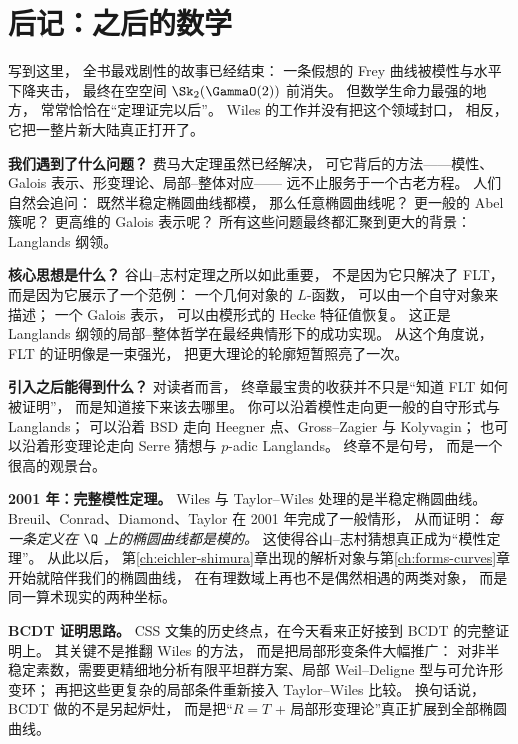 \section{后记：之后的数学}
\label{sec:ch10-epilogue}

写到这里，
全书最戏剧性的故事已经结束：
一条假想的 Frey 曲线被模性与水平下降夹击，
最终在空空间 $\Sk_2(\GammaO(2))$ 前消失。
但数学生命力最强的地方，
常常恰恰在“定理证完以后”。
Wiles 的工作并没有把这个领域封口，
相反，它把一整片新大陆真正打开了。

\textbf{我们遇到了什么问题？}
费马大定理虽然已经解决，
可它背后的方法——模性、Galois 表示、形变理论、局部--整体对应——
远不止服务于一个古老方程。
人们自然会追问：
既然半稳定椭圆曲线都模，
那么任意椭圆曲线呢？
更一般的 Abel 簇呢？
更高维的 Galois 表示呢？
所有这些问题最终都汇聚到更大的背景：Langlands 纲领。

\textbf{核心思想是什么？}
谷山--志村定理之所以如此重要，
不是因为它只解决了 FLT，
而是因为它展示了一个范例：
一个几何对象的 $L$-函数，
可以由一个自守对象来描述；
一个 Galois 表示，
可以由模形式的 Hecke 特征值恢复。
这正是 Langlands 纲领的局部--整体哲学在最经典情形下的成功实现。
从这个角度说，
FLT 的证明像是一束强光，
把更大理论的轮廓短暂照亮了一次。

\textbf{引入之后能得到什么？}
对读者而言，
终章最宝贵的收获并不只是“知道 FLT 如何被证明”，
而是知道接下来该去哪里。
你可以沿着模性走向更一般的自守形式与 Langlands；
可以沿着 BSD 走向 Heegner 点、Gross--Zagier 与 Kolyvagin；
也可以沿着形变理论走向 Serre 猜想与 $p$-adic Langlands。
终章不是句号，
而是一个很高的观景台。



\textbf{2001 年：完整模性定理。}
Wiles 与 Taylor--Wiles 处理的是半稳定椭圆曲线。
Breuil、Conrad、Diamond、Taylor 在 2001 年完成了一般情形，
从而证明：
\emph{每一条定义在 $\Q$ 上的椭圆曲线都是模的。}
这使得谷山--志村猜想真正成为“模性定理”。
从此以后，
第\ref{ch:eichler-shimura}章出现的解析对象与第\ref{ch:forms-curves}章开始就陪伴我们的椭圆曲线，
在有理数域上再也不是偶然相遇的两类对象，
而是同一算术现实的两种坐标。

\textbf{BCDT 证明思路。}
CSS 文集的历史终点，在今天看来正好接到 BCDT 的完整证明上。
其关键不是推翻 Wiles 的方法，
而是把局部形变条件大幅推广：
对非半稳定素数，需要更精细地分析有限平坦群方案、局部 Weil--Deligne 型与可允许形变环；
再把这些更复杂的局部条件重新接入 Taylor--Wiles 比较。
换句话说，BCDT 做的不是另起炉灶，
而是把“$R=T$ + 局部形变理论”真正扩展到全部椭圆曲线。

